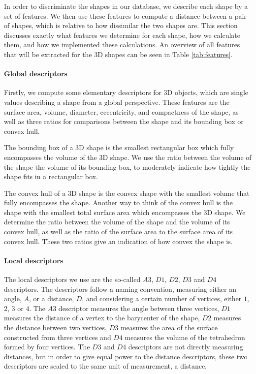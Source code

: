 In order to discriminate the shapes in our database, we describe each shape by a set of features.
We then use these features to compute a distance between a pair of shapes, which is relative to how dissimilar the two
shapes are.
This section discusses exactly what features we determine for each shape, how we calculate them, and how we
implemented these calculations.
An overview of all features that will be extracted for the 3D shapes can be seen in Table \ref{tab:features}.

\paragraph{Global descriptors}
Firstly, we compute some elementary descriptors for 3D objects, which are single values describing a shape from a
global perspective.
These features are the surface area, volume, diameter, eccentricity, and compactness of the shape, as well as three
ratios for comparisons between the shape and its bounding box or convex hull.

The bounding box of a 3D shape is the smallest rectangular box which fully encompasses the volume of the 3D shape.
We use the ratio between the volume of the shape  the volume of its bounding box, to moderately indicate how tightly
the shape fits in a rectangular box.

The convex hull of a 3D shape is the convex shape with the smallest volume that fully encompasses the shape.
Another way to think of the convex hull is the shape with the smallest total surface area which encompasses the 3D shape.
We determine the ratio between the volume of the shape and the volume of its convex hull, as well as the
ratio of the surface area to the surface area of its convex hull.
These two ratios give an indication of how convex the shape is.

\paragraph{Local descriptors}
The local descriptors we use are the so-called $A3$, $D1$, $D2$, $D3$ and $D4$ descriptors.
The descriptors follow a naming convention, measuring either an angle, $A$, or a distance, $D$, and considering a
certain number of vertices, either $1$, $2$, $3$ or $4$.
The $A3$ descriptor measures the angle between three vertices, $D1$ measures the distance of a vertex to the barycenter of the shape, $D2$ measures the distance between two vertices, $D3$ measures the area of the surface constructed from three vertices and $D4$ measures the volume of the tetrahedron formed by four vertices.
The $D3$ and $D4$ descriptors are not directly measuring distances, but in order to give equal power to the distance descriptors, these two descriptors are scaled to the same unit of measurement, a distance.

